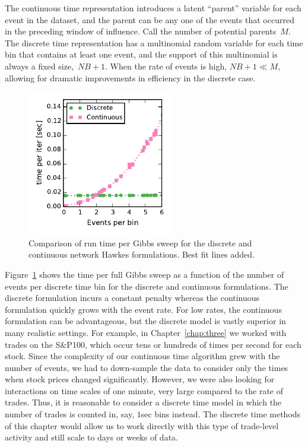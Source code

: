 The continuous time representation introduces a latent ``parent''
variable for each event in the dataset, and the parent can be any one
of the events that occurred in the preceding window of influence. Call
the number of potential parents~$M$. The discrete time representation
has a multinomial random variable for each time bin that contains at least one
event, and the support of this multinomial is always a fixed
size,~${NB+1}$.  When the rate of events is high, $NB+1 \ll M$,
allowing for dramatic improvements in efficiency in the discrete case.

\begin{figure}[t]
  \centering
  \includegraphics[width=2.5in]{figures/ch4/discrete_cont_comparison}
  \caption[Runtime comparison of continuous and discrete time Hawkes models]{
    Comparison of run time per Gibbs sweep for the discrete and continuous network Hawkes formulations. Best fit lines added.}
  \label{fig:disc_vs_cont}
\end{figure}


Figure~\ref{fig:disc_vs_cont} shows the time per full Gibbs sweep as a
function of the number of events per discrete time bin for the
discrete and continuous formulations. The discrete formulation incurs
a constant penalty whereas the continuous formulation quickly grows
with the event rate. For low rates, the continuous formulation can be
advantageous, but the discrete model is vastly superior in many
realistic settings. For example, in Chapter~\ref{chap:three} we worked with
trades on the S\&P100, which occur tens or hundreds of times per
second for each stock. Since the complexity of our continuous time algorithm grew
with the number of events, we had to down-sample the data to consider only
the times when stock prices changed significantly. However, we
were also looking for interactions on time scales of one minute,
very large compared to the rate of trades. Thus, it is
reasonable to consider a discrete time model in which the number of
trades is counted in, say, $1$sec bins instead. The discrete time
methods of this chapter would allow us to work directly with this type of
trade-level activity and still scale to days or weeks of data.

